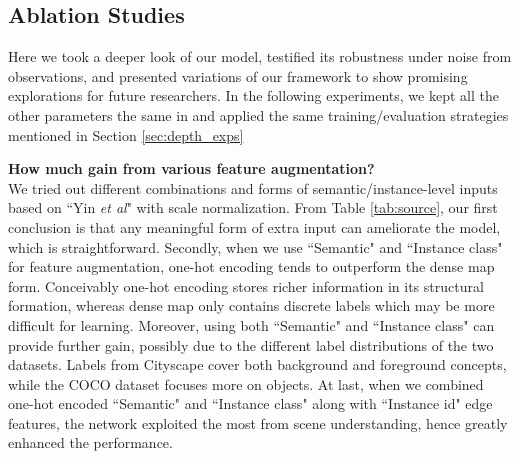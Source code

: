 \documentclass[10pt,twocolumn]{article}
\newcommand{\Noindent}{\vspace{2pt} \noindent}
\newcommand{\parquest}[1]{\Noindent\textbf{#1?\\}}
\begin{document}
\subsection{Ablation Studies}
\label{sec:ablation}
Here we took a deeper look of our model, testified its robustness under noise from observations, and presented variations of our framework to show promising explorations for future researchers. In the following experiments, we kept all the other parameters the same in \cite{yin2018geonet} and applied the same training/evaluation strategies mentioned in Section \ref{sec:depth_exps}

\parquest{How much gain from various feature augmentation}We tried out different combinations and forms of semantic/instance-level inputs based on ``Yin\textit{ et al}" \cite{yin2018geonet} with scale normalization. From Table \ref{tab:source}, our first conclusion is that any meaningful form of extra input can ameliorate the model, which is straightforward. Secondly, when we use ``Semantic" and ``Instance class" for feature augmentation, one-hot encoding tends to outperform the dense map form. Conceivably one-hot encoding stores richer information in its structural formation, whereas dense map only contains discrete labels which may be more difficult for learning. Moreover, using both ``Semantic" and ``Instance class" can provide further gain, possibly due to the different label distributions of the two datasets. Labels from Cityscape \cite{cordts2016cityscapes} cover both background and foreground concepts, while the COCO dataset \cite{lin2014microsoft} focuses more on objects. At last, when we combined one-hot encoded ``Semantic" and ``Instance class" along with ``Instance id" edge features, the network exploited the most from scene understanding, hence greatly enhanced the performance.
\end{document}
